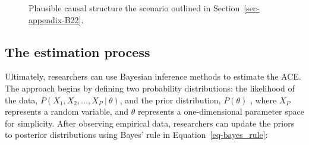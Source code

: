 \documentclass[
  authoryear,
  review,
  1p]{elsarticle}
\begin{document}
\begin{figure}

\begin{minipage}{0.50\linewidth}

\centering{

\[
\begin{aligned}
  X & := f_{X}(e_{X}) \\
  T & := t \\
  Y & := f_{Y}(t,X,e_{Y}) \\
  e_{T} & \:\bot\:e_{X} \\
  e_{T} & \:\bot\:e_{Y} \\
  e_{X} & \:\bot\:e_{Y}
\end{aligned}
\]

}


\end{minipage}%
%
\begin{minipage}{0.50\linewidth}



\end{minipage}%

\caption{\label{fig-example3}Plausible causal structure the scenario
outlined in Section~\ref{sec-appendix-B22}.}

\end{figure}%

\subsection{The estimation process}\label{sec-appendix-C}

Ultimately, researchers can use Bayesian inference methods to estimate
the ACE. The approach begins by defining two probability distributions:
the likelihood of the data,
\(P(X_{1}, X_{2}, \dots, X_{P} \:|\:\theta)\), and the prior
distribution, \(P(\theta)\) \citep{Everitt_et_al_2010}, where \(X_{P}\)
represents a random variable, and \(\theta\) represents a
one-dimensional parameter space for simplicity. After observing
empirical data, researchers can update the priors to posterior
distributions using Bayes' rule in Equation~\ref{eq-bayes_rule}:
\end{document}
